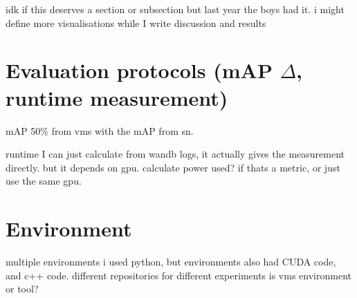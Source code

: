 idk if this deserves a section or subsection but last year the boys had it. i might define more visualisations while I write discussion and results

\section{Evaluation protocols (mAP $\Delta$, runtime measurement)}

mAP 50\% from vms with the mAP from sn. 

runtime I can just calculate from wandb logs, it actually gives the measurement directly. but it depends on gpu.
calculate power used? if thats a metric, or just use the same gpu. 

\section{Environment} 

multiple environments
i used python, but environments also had CUDA code, and c++ code. 
different repositories for different experiments
is vms environment or tool?